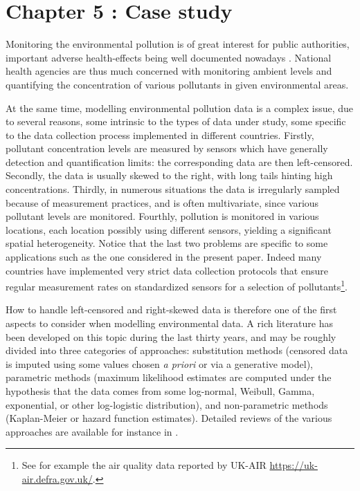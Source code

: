 
\chapter{Chapter 5 : Case study}\label{chp:5}

\minitoc

Monitoring the environmental pollution is of great interest for public authorities, important adverse health-effects being well documented nowadays \cite{khopkar2007,Marchant2018,NOUGADERE201432}. National health agencies are thus much concerned with monitoring ambient levels and quantifying the concentration of various pollutants in given environmental areas. 

At the same time, modelling environmental pollution data is a complex issue, due to several reasons, some intrinsic to the types of data under study, some specific to the data collection process implemented in different countries. Firstly, pollutant concentration levels are measured by sensors which have generally detection and quantification limits: the corresponding data are then left-censored. Secondly, the data is usually skewed to the right, with long tails hinting high concentrations. Thirdly, in numerous situations the data is irregularly sampled because of measurement practices, and is often multivariate, since various pollutant levels are monitored. Fourthly, pollution is monitored in various locations, each location possibly using different sensors, yielding a significant spatial heterogeneity. Notice that the last two problems are specific to some applications such as the one considered in the present paper. Indeed many countries have implemented very strict data collection protocols that ensure regular measurement rates on standardized sensors for a selection of pollutants\footnote{See for example the air quality data reported by UK-AIR \url{https://uk-air.defra.gov.uk/}.}. 

How to handle left-censored and right-skewed data is therefore one of the first aspects to consider when modelling environmental data. A rich literature has been developed on this topic during the last thirty years, and may be roughly divided into three categories of approaches: substitution methods (censored data is imputed using some values chosen \emph{a priori} or via a generative model), parametric methods (maximum likelihood estimates are computed under the hypothesis that the data comes from some log-normal, Weibull, Gamma, exponential, or other log-logistic distribution), and non-parametric methods (Kaplan-Meier or hazard function estimates). Detailed reviews of the various approaches are available  for instance in \cite{Authority2010,Hewett2007ACO,Mitra2008,Canales2018,Antweiler2008,Gillespie2010,shoari2018toward}.

